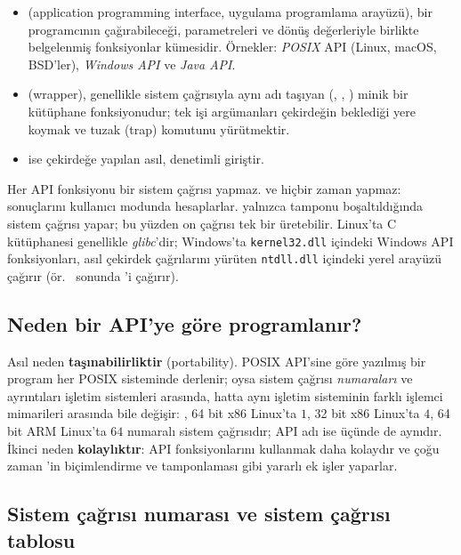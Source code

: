\begin{itemize}
  \item {} (application programming interface, uygulama programlama arayüzü), bir programcının çağırabileceği, parametreleri ve dönüş değerleriyle birlikte belgelenmiş fonksiyonlar kümesidir. Örnekler: \emph{POSIX} API (Linux, macOS, BSD'ler), \emph{Windows API} ve \emph{Java API}.
  \item {} (wrapper), genellikle sistem çağrısıyla aynı adı taşıyan (, , ) minik bir kütüphane fonksiyonudur; tek işi argümanları çekirdeğin beklediği yere koymak ve tuzak (trap) komutunu yürütmektir.
  \item {} ise çekirdeğe yapılan asıl, denetimli giriştir.
\end{itemize}

Her API fonksiyonu bir sistem çağrısı yapmaz.  ve  hiçbir zaman yapmaz: sonuçlarını kullanıcı modunda hesaplarlar.  yalnızca tamponu boşaltıldığında sistem çağrısı yapar; bu yüzden on  çağrısı tek bir  üretebilir. Linux'ta C kütüphanesi genellikle \emph{glibc}'dir; Windows'ta \texttt{kernel32.dll} içindeki Windows API fonksiyonları, asıl çekirdek çağrılarını yürüten \texttt{ntdll.dll} içindeki yerel arayüzü çağırır (ör.\  sonunda 'i çağırır).

\subsection{Neden bir API'ye göre programlanır?}

Asıl neden \textbf{taşınabilirliktir} (portability). POSIX API'sine göre yazılmış bir program her POSIX sisteminde derlenir; oysa sistem çağrısı \emph{numaraları} ve ayrıntıları işletim sistemleri arasında, hatta aynı işletim sisteminin farklı işlemci mimarileri arasında bile değişir: , 64 bit x86 Linux'ta $1$, 32 bit x86 Linux'ta $4$, 64 bit ARM Linux'ta $64$ numaralı sistem çağrısıdır; API adı  ise üçünde de aynıdır. İkinci neden \textbf{kolaylıktır}: API fonksiyonlarını kullanmak daha kolaydır ve çoğu zaman 'in biçimlendirme ve tamponlaması gibi yararlı ek işler yaparlar.

\subsection{Sistem çağrısı numarası ve sistem çağrısı tablosu}

